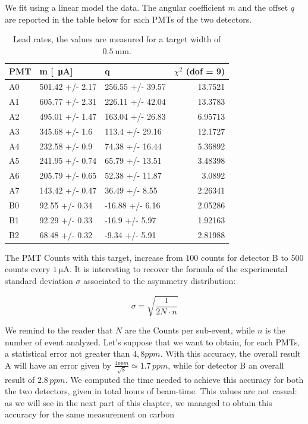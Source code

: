 We fit using a linear model the data. The angular coefficient $m$ and the offset $q$ are reported in the table below for each PMTs of the two detectors.  

\begin{table}[ht]
\centering
\begin{tabular}{lllr}
\hline
 PMT   & m [\SI{}{\micro \ampere}]          & q                &  $\chi^{2}$ (dof = 9) \\
\hline
 A0    & 501.42 +/- 2.17 & 256.55 +/- 39.57 & 13.7521  \\
 A1    & 605.77 +/- 2.31 & 226.11 +/- 42.04 & 13.3783  \\
 A2    & 495.01 +/- 1.47 & 163.04 +/- 26.83 &  6.95713 \\
 A3    & 345.68 +/- 1.6  & 113.4 +/- 29.16  & 12.1727  \\
 A4    & 232.58 +/- 0.9  & 74.38 +/- 16.44  &  5.36892 \\
 A5    & 241.95 +/- 0.74 & 65.79 +/- 13.51  &  3.48398 \\
 A6    & 205.79 +/- 0.65 & 52.38 +/- 11.87  &  3.0892  \\
 A7    & 143.42 +/- 0.47 & 36.49 +/- 8.55   &  2.26341 \\
 B0    & 92.55 +/- 0.34  & -16.88 +/- 6.16  &  2.05286 \\
 B1    & 92.29 +/- 0.33  & -16.9 +/- 5.97   &  1.92163 \\
 B2    & 68.48 +/- 0.32  & -9.34 +/- 5.91   &  2.81988 \\
\hline
\end{tabular}
\caption{Lead rates, the values are measured for a target width of $\SI{0.5}{\milli \meter}$.}
\end{table}


The PMT Counts with this target, increase from $100$ counts for detector B to $500$ counts every $\SI{1}{\micro \ampere}$.  It is interesting to recover the formula of the experimental standard deviation $\sigma$ associated to the asymmetry distribution:

\begin{equation}
\sigma = \sqrt{\dfrac{1}{2 N \cdot n}}
\end{equation}

We remind to the reader that $N$ are the Counts per sub-event, while  $n$ is the number of event analyzed.
Let's suppose that we want to obtain, for each PMTs, a statistical error not greater than $4,8 ppm$. With this accuracy, the overall result A will have an error given by $\frac{4ppm}{\sqrt{8}} \simeq 1.7 \, ppm$, while for detector B an overall result of $2.8 \, ppm$.
We computed the time needed to achieve this accuracy for both the two detectors, given in total hours of beam-time. This values are not casual: as we will see in the next part of this chapter, we managed to obtain this accuracy for the same measurement on carbon  

